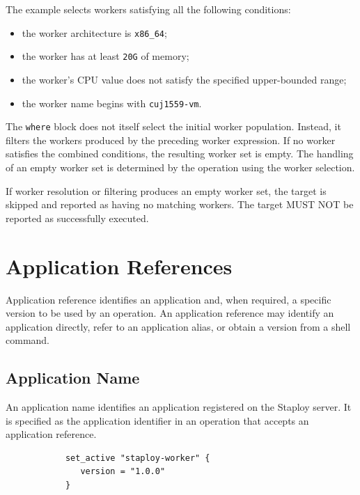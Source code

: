 \documentclass[11pt,a4paper]{article}
\begin{document}
    The example selects workers satisfying all the following conditions:

    \begin{itemize}
        \item the worker architecture is \texttt{x86\_64};
        \item the worker has at least \texttt{20G} of memory;
        \item the worker's CPU value does not satisfy the specified upper-bounded range;
        \item the worker name begins with \texttt{cuj1559-vm}.
    \end{itemize}

    The \texttt{where} block does not itself select the initial worker population.
    Instead, it filters the workers produced by the preceding worker expression.
    If no worker satisfies the combined conditions, the resulting worker set is empty.
    The handling of an empty worker set is determined by the operation using the worker selection.

    If worker resolution or filtering produces an empty worker set,
    the target is skipped and reported as having no matching workers.
    The target MUST NOT be reported as successfully executed.


    \section{Application References}\label{sec:application-references}

    Application reference identifies an application and, when required, a specific version to be used by an operation.
    An application reference may identify an application directly, refer to an application alias, or obtain a version from a shell command.

    \subsection{Application Name}\label{subsec:application-name}

    An application name identifies an application registered on the Staploy server.
    It is specified as the application identifier in an operation that accepts an application reference.

    \begin{center}
        \begin{verbatim}
            set_active "staploy-worker" {
               version = "1.0.0"
            }
        \end{verbatim}
    \end{center}
\end{document}
